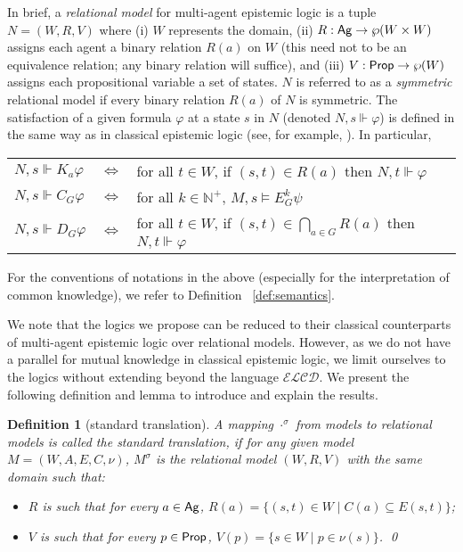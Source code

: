 \documentclass{article}
\newtheorem{definition}[theorem]{Definition}%
\newcommand{\ab}{\ensuremath{A}\xspace}
\newcommand{\ag}{\text{\normalfont\textsf{Ag}}\xspace}
\renewcommand{\phi}{\varphi}
\newcommand{\prop}{\text{\normalfont\textsf{Prop}}\xspace}
\newcommand{\mbN}{\mathbb{N}}
\newcommand{\langcd}{\ensuremath{\mathcal{ELCD}}\xspace}
\begin{document}
In brief, a \emph{relational model} for multi-agent epistemic logic is a tuple $N = (W,R,V)$ where (i) $W$ represents the domain, (ii) $R : \ag \to \wp(W \times W)$ assigns each agent a binary relation $R(a)$ on $W$ (this need not to be an equivalence relation; any binary relation will suffice), and (iii) $V: \prop \to \wp(W)$ assigns each propositional variable a set of states. $N$ is referred to as a \emph{symmetric} relational model if every binary relation $R(a)$ of $N$ is symmetric. The satisfaction of a given formula $\phi$ at a state $s$ in $N$ (denoted $N,s \Vdash \phi$) is defined in the same way as in classical epistemic logic (see, for example, \cite{FHMV1995}). In particular, 
\begin{center}
\vspace{6pt}
\begin{tabular}{lll}
$N,s \Vdash K_a \phi$ &$\iff$& for all $t \in W$, if $(s,t) \in R(a)$ then $N,t \Vdash \phi$\\
$N,s \Vdash C_G \phi$ &$\iff$& for all $k \in \mbN^+$, $M,s \models E_G^k \psi$\\
$N,s \Vdash D_G \phi$ &$\iff$& for all $t \in W$, if $(s,t) \in \bigcap_{a \in G} R(a)$ then $N,t \Vdash \phi$\\
\end{tabular}
\vspace{6pt}
\end{center}
For the conventions of notations in the above (especially for the interpretation of common knowledge), we refer to Definition ~\ref{def:semantics}.

We note that the logics we propose can be reduced to their classical counterparts of multi-agent epistemic logic over relational models. However, as we do not have a parallel for mutual knowledge in classical epistemic logic, we limit ourselves to the logics without extending beyond the language \langcd. We present the following definition and lemma to introduce and explain the results.

\begin{definition}[standard translation]\label{def:trans-r}
A mapping $\cdot^\sigma$ from models to relational models is called the \emph{standard translation}, if for any given model $M = (W,\ab,E,C,\nu)$, $M^\sigma$ is the relational model $(W,R,V)$ with the same domain such that:
\begin{itemize}
\item $R$ is such that for every $a \in \ag$, $R(a) = \{ (s,t) \in W \mid C(a) \subseteq E(s,t)\}$;
\item $V$ is such that for every $p \in \prop$, $V(p) = \{s \in W \mid p \in \nu(s)\}$.
\qed
\end{itemize}
\end{definition}
\end{document}

